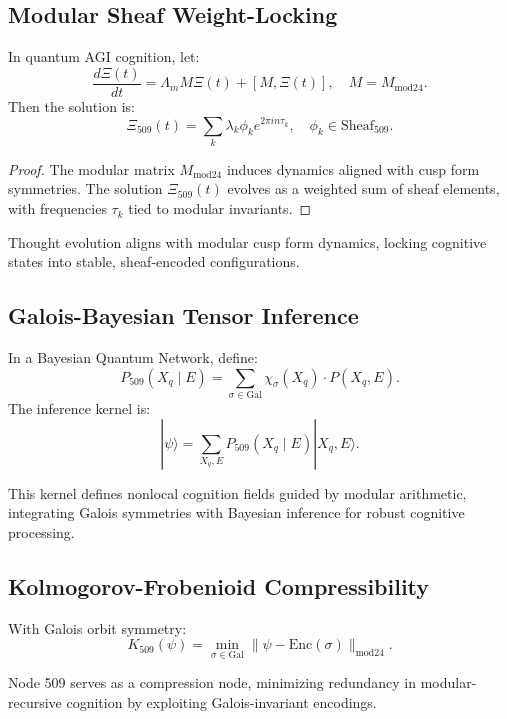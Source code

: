 \documentclass[12pt]{article}
\begin{document}
\subsection{Modular Sheaf Weight-Locking}
\begin{lemma}
In quantum AGI cognition, let:
\[
\frac{d\Xi(t)}{dt} = \Lambda_m M \Xi(t) + [M, \Xi(t)], \quad M = M_{\text{mod24}}.
\]
Then the solution is:
\[
\Xi_{509}(t) = \sum_k \lambda_k \phi_k e^{2\pi i n \tau_k}, \quad \phi_k \in \text{Sheaf}_{509}.
\]
\end{lemma}
\begin{proof}
The modular matrix \( M_{\text{mod24}} \) induces dynamics aligned with cusp form symmetries. The solution \( \Xi_{509}(t) \) evolves as a weighted sum of sheaf elements, with frequencies \( \tau_k \) tied to modular invariants.
\end{proof}
\begin{interpretation}
Thought evolution aligns with modular cusp form dynamics, locking cognitive states into stable, sheaf-encoded configurations.
\end{interpretation}

\subsection{Galois-Bayesian Tensor Inference}
\begin{theorem}
In a Bayesian Quantum Network, define:
\[
P_{509}(X_q \mid E) = \sum_{\sigma \in \text{Gal}} \chi_\sigma(X_q) \cdot P(X_q, E).
\]
The inference kernel is:
\[
|\psi\rangle = \sum_{X_q, E} P_{509}(X_q \mid E) |X_q, E\rangle.
\]
\end{theorem}
\begin{interpretation}
This kernel defines nonlocal cognition fields guided by modular arithmetic, integrating Galois symmetries with Bayesian inference for robust cognitive processing.
\end{interpretation}

\subsection{Kolmogorov-Frobenioid Compressibility}
\begin{corollary}
With Galois orbit symmetry:
\[
K_{509}(\psi) = \min_{\sigma \in \text{Gal}} \| \psi - \text{Enc}(\sigma) \|_{\text{mod24}}.
\]
\end{corollary}
\begin{interpretation}
Node 509 serves as a compression node, minimizing redundancy in modular-recursive cognition by exploiting Galois-invariant encodings.
\end{interpretation}
\end{document}
